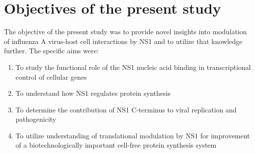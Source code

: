\newpage
\section{Objectives of the present study}

The objective of the present study was to provide novel insights into modulation of influenza A virus-host cell interactions by NS1 and to utilize that knowledge further. The specific aims were:

	\begin{enumerate}
		\item To study the functional role of the NS1 nucleic acid binding in transcriptional control of cellular genes
		
		\item To understand how NS1 regulates protein synthesis
		
		\item To determine the contribution of NS1 C-terminus to viral replication and pathogenicity
		
		\item To utilize understanding of translational modulation by NS1 for improvement of a biotechnologically important cell-free protein synthesis system
		
	\end{enumerate}